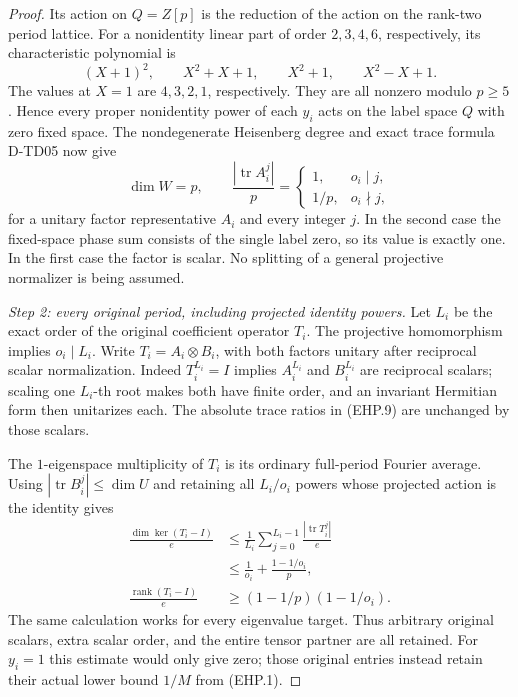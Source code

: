 \begin{proof}
Its action on \(Q=Z[p]\) is the reduction of the action on the
rank-two period lattice.  For a nonidentity linear part of order
\(2,3,4,6\), respectively, its characteristic polynomial is
\[
 (X+1)^2,\qquad X^2+X+1,\qquad X^2+1,\qquad X^2-X+1.
 \tag{EHP.8}
\]
The values at \(X=1\) are \(4,3,2,1\), respectively.  They are all
nonzero modulo \(p\ge5\).  Hence every proper nonidentity power of
each \(y_i\) acts on the label space \(Q\) with zero fixed space.
The nondegenerate Heisenberg degree and exact trace formula D-TD05
now give
\[
 \dim W=p,\qquad
 \frac{|\operatorname{tr}A_i^j|}{p}
 =
 \begin{cases}
 1,&o_i\mid j,\\
 1/p,&o_i\nmid j,
 \end{cases}
 \tag{EHP.9}
\]
for a unitary factor representative \(A_i\) and every integer \(j\).
In the second case the fixed-space phase sum consists of the single
label zero, so its value is exactly one.  In the first case the
factor is scalar.  No splitting of a general projective normalizer
is being assumed.

\emph{Step 2: every original period, including projected identity powers.}
Let \(L_i\) be the exact order of the original coefficient operator
\(T_i\).  The projective homomorphism implies \(o_i\mid L_i\).
Write \(T_i=A_i\otimes B_i\), with both factors unitary after
reciprocal scalar normalization.  Indeed \(T_i^{L_i}=I\) implies
\(A_i^{L_i}\) and \(B_i^{L_i}\) are reciprocal scalars; scaling one
\(L_i\)-th root makes both have finite order, and an invariant
Hermitian form then unitarizes each.  The absolute trace ratios
in (EHP.9) are unchanged by those scalars.

The \(1\)-eigenspace multiplicity of \(T_i\) is its ordinary full-period
Fourier average.  Using \(|\operatorname{tr}B_i^j|\le\dim U\) and
retaining all \(L_i/o_i\) powers whose projected action is the
identity gives
\[
 \begin{split}
 \frac{\dim\ker(T_i-I)}e
 &\le \frac1{L_i}\sum_{j=0}^{L_i-1}
                    \frac{|\operatorname{tr}T_i^j|}{e}\\
 &\le \frac1{o_i}+\frac{1-1/o_i}{p},\\
 \frac{\operatorname{rank}(T_i-I)}e
 &\ge (1-1/p)(1-1/o_i).
 \end{split}
 \tag{EHP.10}
\]
The same calculation works for every eigenvalue target.  Thus
arbitrary original scalars, extra scalar order, and the entire
tensor partner are all retained.  For \(y_i=1\) this estimate would
only give zero; those original entries instead retain their
actual lower bound \(1/M\) from (EHP.1).


\end{proof}
